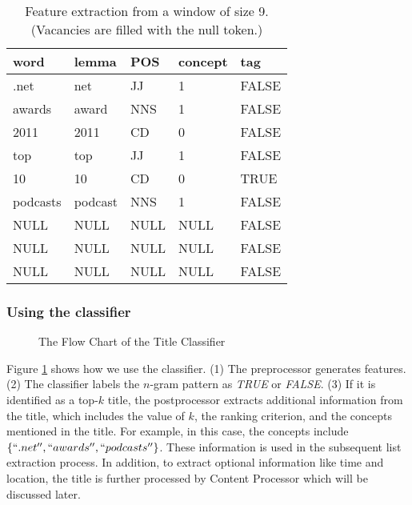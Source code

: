
\begin{table}
\centering
\caption{Feature extraction from a window of  size 9. (Vacancies are filled with the null token.)}
\begin{tabular}{|l|l|l|l|l|}
\hline
\textbf{word}    &\textbf{lemma}   &\textbf{POS}    &\textbf{concept}   &\textbf{tag} \\ \hline
.net        &net        &JJ	    &1  &FALSE\\
awards      &award      &NNS	&1  &FALSE\\
2011        &2011       &CD	    &0  &FALSE\\
top         &top        &JJ	    &1  &FALSE\\
10          &10	        &CD     &0  &TRUE\\
podcasts	&podcast    &NNS	&1  &FALSE\\
NULL        &NULL       &NULL	&NULL  &FALSE\\
NULL        &NULL       &NULL	&NULL  &FALSE\\
NULL        &NULL       &NULL	&NULL  &FALSE\\
\hline
\end{tabular}
\label{tab:modelPattern}
\end{table}

\subsubsection{Using the classifier}


\begin{figure}
\centering
{}
\caption{The Flow Chart of the Title Classifier}
\label{fig:titleClassifier}
\end{figure}

Figure \ref{fig:titleClassifier} shows how we use the classifier.  (1)
The preprocessor generates features.  (2) The classifier labels the
$n$-gram pattern as \emph{TRUE} or \emph{FALSE}.  (3) If it is
identified as a top-$k$ title, the postprocessor extracts additional
information from the title, which includes the value of $k$, the
ranking criterion, and
the concepts mentioned in the title.  For example, in this case, the
concepts include $\{``.net'',``awards'', ``podcasts''\}$. These
information is used in the subsequent list extraction process.
In addition, to extract optional information like time and location,
the title is further processed by Content Processor which will be discussed
later.
%
%

